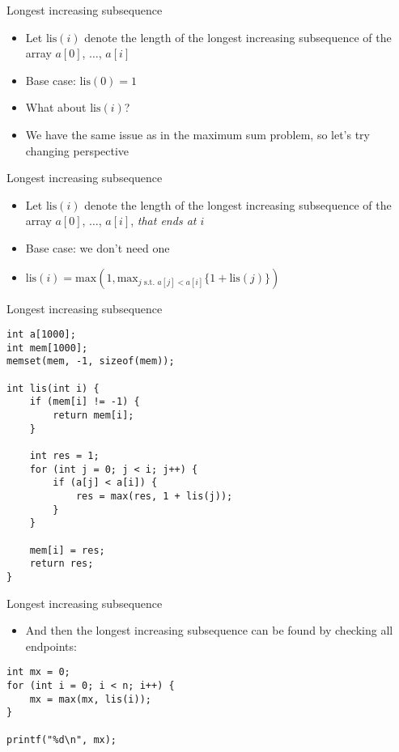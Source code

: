 \documentclass[12pt,t]{beamer}
\newcommand{\bi}{\begin{itemize}}
\newcommand{\ei}{\end{itemize}}
\begin{document}
\begin{frame}{Longest increasing subsequence}
    \vspace{20pt}
    \bi
\item Let $\mathrm{lis}(i)$ denote the length of the longest increasing subsequence of the array $a[0]$, $\ldots$, $a[i]$
    \vspace{5pt}
\item Base case: $\mathrm{lis}(0) = 1$
\item What about $\mathrm{lis}(i)$?
    \vspace{10pt}
\item We have the same issue as in the maximum sum problem, so let's try changing perspective
    \ei
\end{frame}

\begin{frame}{Longest increasing subsequence}
    \vspace{40pt}
    \bi
\item Let $\mathrm{lis}(i)$ denote the length of the longest increasing subsequence of the array $a[0]$, $\ldots$, $a[i]$, \textit{that ends at $i$}
    \vspace{5pt}
\item Base case: we don't need one
\item $\mathrm{lis}(i) = \mathrm{max}(1, \mathrm{max}_{j \textrm{ s.t. } a[j] < a[i]} \{ 1 + \mathrm{lis}(j) \})$
    \ei
\end{frame}

\begin{frame}[fragile]{Longest increasing subsequence}
    \begin{verbatim}
int a[1000];
int mem[1000];
memset(mem, -1, sizeof(mem));

int lis(int i) {
    if (mem[i] != -1) {
        return mem[i];
    }

    int res = 1;
    for (int j = 0; j < i; j++) {
        if (a[j] < a[i]) {
            res = max(res, 1 + lis(j));
        }
    }

    mem[i] = res;
    return res;
}
    \end{verbatim}
\end{frame}

\begin{frame}[fragile]{Longest increasing subsequence}
    \vspace{30pt}

    \bi
        \item And then the longest increasing subsequence can be found by checking all endpoints:
    \ei

    \begin{verbatim}
int mx = 0;
for (int i = 0; i < n; i++) {
    mx = max(mx, lis(i));
}

printf("%d\n", mx);
    \end{verbatim}
\end{frame}
\end{document}
